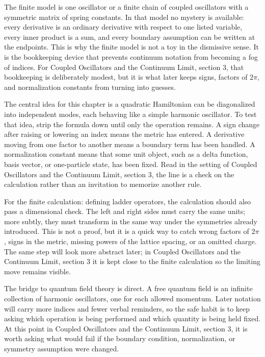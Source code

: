 The finite model is one oscillator or a finite chain of coupled oscillators with a symmetric matrix of spring constants.  In that model no mystery is available: every derivative is an ordinary derivative with respect to one listed variable, every inner product is a sum, and every boundary assumption can be written at the endpoints.  This is why the finite model is not a toy in the dismissive sense.  It is the bookkeeping device that prevents continuum notation from becoming a fog of indices.  For Coupled Oscillators and the Continuum Limit, section 3, that bookkeeping is deliberately modest, but it is what later keeps signs, factors of \(2\pi\), and normalization constants from turning into guesses.

The central idea for this chapter is a quadratic Hamiltonian can be diagonalized into independent modes, each behaving like a simple harmonic oscillator.  To test that idea, strip the formula down until only the operation remains.  A sign change after raising or lowering an index means the metric has entered.  A derivative moving from one factor to another means a boundary term has been handled.  A normalization constant means that some unit object, such as a delta function, basis vector, or one-particle state, has been fixed.  Read in the setting of Coupled Oscillators and the Continuum Limit, section 3, the line is a check on the calculation rather than an invitation to memorize another rule.

For the finite calculation: defining ladder operators, the calculation should also pass a dimensional check.  The left and right sides must carry the same units; more subtly, they must transform in the same way under the symmetries already introduced.  This is not a proof, but it is a quick way to catch wrong factors of \(2\pi\), signs in the metric, missing powers of the lattice spacing, or an omitted charge.  The same step will look more abstract later; in Coupled Oscillators and the Continuum Limit, section 3 it is kept close to the finite calculation so the limiting move remains visible.

The bridge to quantum field theory is direct.  A free quantum field is an infinite collection of harmonic oscillators, one for each allowed momentum.  Later notation will carry more indices and fewer verbal reminders, so the safe habit is to keep asking which operation is being performed and which quantity is being held fixed.  At this point in Coupled Oscillators and the Continuum Limit, section 3, it is worth asking what would fail if the boundary condition, normalization, or symmetry assumption were changed.

